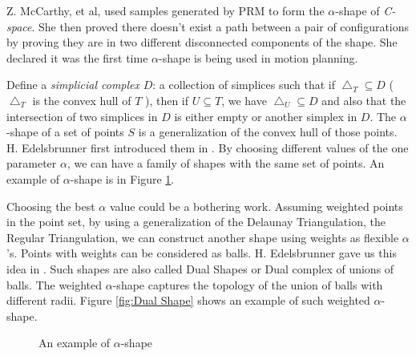 \documentclass[11pt]{article}
\begin{document}
\indent Z. McCarthy, et al, \cite{PathNonexistance} used samples generated by PRM to form the $\alpha$-shape of \emph{C-space}. She then proved there doesn't exist a path between a pair of configurations by proving they are in two different disconnected components of the shape. She declared it was the first time $\alpha$-shape is being used in motion planning.

\indent Define a \emph{simplicial complex} $D$: a collection of simplices such that if $\bigtriangleup_T \subseteq D$ ( $\bigtriangleup_T$ is the convex hull of $T$ ), then if $U \subseteq T$, we have $\bigtriangleup_U \subseteq D$ and also that the intersection of two simplices in $D$ is either empty or another simplex in $D$. The $\alpha$-shape of a set of points $S$ is a generalization of the convex hull of those points\cite{PathNonexistance}. H. Edelsbrunner first introduced them in \cite{PointSetShape}. By choosing different values of the one parameter $\alpha$, we can have a family of shapes with the same set of points. An example of $\alpha$-shape is in Figure \ref{fig:Alpha-shape}.

\indent Choosing the best $\alpha$ value could be a bothering work. Assuming weighted points in the point set, by using a generalization of the Delaunay Triangulation, the Regular Triangulation, we can construct another shape using weights as flexible $\alpha$'s. Points with weights can be considered as balls. H. Edelsbrunner gave us this idea in \cite{DualShape}. Such shapes are also called Dual Shapes or Dual complex of unions of balls. The weighted $\alpha$-shape captures the topology of the union of balls with different radii. Figure \ref{fig:Dual Shape} shows an example of such weighted $\alpha$-shape.

\begin{figure}
	\caption{\label{fig:Alpha-shape} An example of $\alpha$-shape}
\end{figure}
\end{document}
